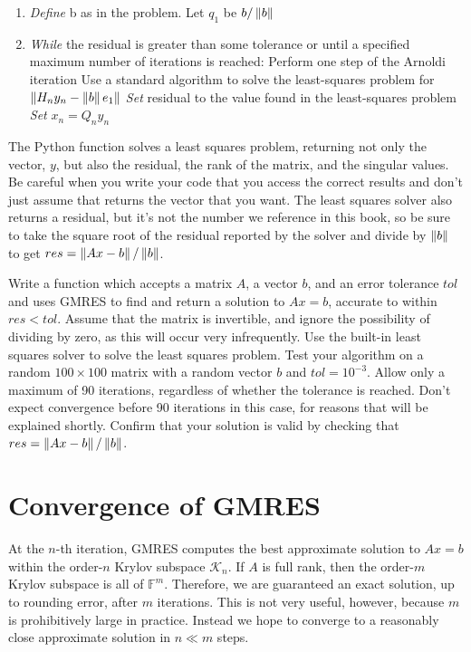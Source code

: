 \begin{enumerate}
\item \emph{Define} b as in the problem. Let $q_1$ be $b/\left\lVert b\right\rVert$
\item \emph{While} the residual is greater than some tolerance or until a specified maximum number of
iterations is reached:
\subitem Perform one step of the Arnoldi iteration
\subitem Use a standard algorithm to solve the least-squares problem for $\left\lVert H_n y_n - \left\lVert b\right\rVert e_1\right\rVert$
\subitem \emph{Set} residual to the value found in the least-squares problem
\subitem \emph{Set} $x_n=Q_n y_n$
\end{enumerate}

\begin{warn}
The Python function  solves a least squares problem, returning not only the vector, $y$, but also the residual, 
the rank of the matrix, and the singular values.
Be careful when you write your code that you access the correct results and don't just assume that  returns the 
vector that you want.
The least squares solver also returns a residual, but it's not the number we reference in this book, so be sure to take the square 
root of the residual reported by the solver and divide by $\left\lVert b\right\rVert$ to get $res=\left\lVert Ax-b\right\rVert/\left\lVert b\right\rVert$.
\end{warn}

\begin{problem}
Write a function which accepts a matrix $A$, a vector $b$, and an error tolerance $tol$ and uses GMRES to find and return a solution 
to $Ax=b$, accurate to within $res < tol$.
Assume that the matrix is invertible, and ignore the possibility of dividing by zero, as this will occur very infrequently.
Use the built-in least squares solver to solve the least squares problem.
Test your algorithm on a random $100\times 100$ matrix with a random vector $b$ and $tol=10^{-3}$.
Allow only a maximum of 90 iterations, regardless of whether the tolerance is reached.
Don't expect convergence before 90 iterations in this case, for reasons that will be explained shortly.
Confirm that your solution is valid by checking that $res = \left\lVert Ax-b\right\rVert/\left\lVert b\right\rVert$.
\label{prob:MyGMRES}
\end{problem}

\section*{Convergence of GMRES}
At the $n$-th iteration, GMRES computes the best approximate solution to $Ax = b$ within the order-$n$ Krylov subspace
$\mathcal{K}_n$.
If $A$ is full rank, then the order-$m$ Krylov subspace is all of  $\mathbb{F}^m$.
Therefore, we are guaranteed an exact solution, up to rounding error, after $m$ iterations.
This is not very useful, however, because $m$ is prohibitively large in practice. 
Instead we hope to converge to a reasonably close approximate solution in $n \ll m$ steps.

